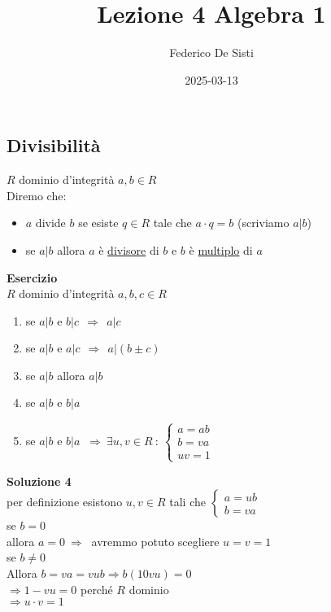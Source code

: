\documentclass[12px]{article}
\title{Lezione 4 Algebra 1}
\date{2025-03-13}
\author{Federico De Sisti}
\begin{document}
	\maketitle
	\newpage
	\subsection{Divisibilità}
	\begin{nota}[Divisibilità]
		$R$ dominio d'integrità $a,b\in R$\\
		Diremo che:
		\begin{itemize}
			\item $a$ divide $b$ se esiste $q\in R$ tale che  $a\cdot q = b$ (scriviamo  $a|b$)
		\item se  $a|b$ allora  $a$ è \underline{divisore} di $b$ e $b$ è \underline{multiplo} di $a$
		\end{itemize}
	\end{nota}
	\textbf{Esercizio}\\
	$R$ dominio d'integrità $a,b,c\in R$
	 \begin{enumerate}
		 \item se $a|b$ e $b|c \ \ \Rightarrow  \ \ a | c$ 
		 \item se $a |b$ e $a|c \ \   \Rightarrow \ \ a|(b\pm c)$ 
		 \item se $a|b$ allora $a|b$
		 \item se  $a|b$ e $b|a$ 
		 \item se $a|b$ e $b|a$  $ \ \Rightarrow  \ \exists u,v\in R\ : \ \begin{cases}
		 	a = ab\\b = va \\ uv = 1
		 \end{cases}$
	\end{enumerate}
	\textbf{Soluzione 4}\\
	per definizione esistono $u,v\in R$ tali che  $ \begin{cases}
		a = ub \\ b = va
	\end{cases}$\\
	se $b = 0 $\\
	allora  $a = 0 \ \Rightarrow \ $ avremmo potuto scegliere $u=v=1$\\
	 se $b\neq 0 $\\
	 Allora $b = va = vub \Rightarrow b(1 0 vu) = 0$ \\
	 $ \Rightarrow 1 - vu = 0$ perché $R$ dominio\\
	  $ \Rightarrow u\cdot v = 1$ \\
\end{document}
